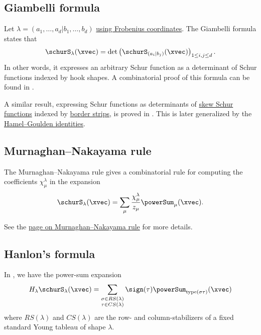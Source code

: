 \subsection[schurGiambelliFormula]{Giambelli formula}

Let $\lambda=(a_1,\dotsc,a_d|b_1,\dotsc,b_d)$ \hyperref[prelimPartitions]{using Frobenius coordinates}.
The Giambelli formula states that
\[
\schurS_{\lambda}(\xvec) = \det \left(  \schurS_{(a_i|b_j)}(\xvec) \right)_{1\leq i,j \leq d}.
\]
In other words, it expresses an arbitrary Schur function as a determinant of Schur functions
indexed by hook shapes.
A combinatorial proof of this formula can be found in \cite{EgeciogluRemmel1988}.

A similar result, expressing Schur functions as determinants of
\hyperref[schurSkew]{skew Schur functions} indexed by \hyperref[skewShapes]{border strips},
is proved in \cite{LascouxPragacz1988}.
This is later generalized by the \hyperref[schurStripDecompFormula]{Hamel--Goulden identities}.



\subsection[schurMurnaghanNakayama]{Murnaghan--Nakayama rule}

The Murnaghan--Nakayama rule gives a combinatorial rule for computing the coefficients $\chi^{\lambda}_{\mu}$
in the expansion
\begin{equation*}
 \schurS_\lambda(\xvec) = \sum_{\mu} \frac{\chi^{\lambda}_{\mu}}{z_\mu} \powerSum_{\mu}(\xvec).
\end{equation*}

See the \hyperref[murnaghanNakayamaRule]{page on Murnaghan--Nakayama rule} for more details.


\subsection[schurHanlonFormula]{Hanlon's formula}


In \cite{Hanlon1988}, we have the power-sum expansion
\begin{equation*}
H_\lambda \schurS_\lambda(\xvec) =
\sum_{\substack{\sigma \in RS(\lambda) \\ \tau \in CS(\lambda)}} \sign(\tau) \powerSum_{\mathrm{type}(\sigma\tau)}(\xvec)
\end{equation*}
where $RS(\lambda)$ and $CS(\lambda)$ are the row- and column-stabilizers
of a fixed standard Young tableau of shape $\lambda$.

